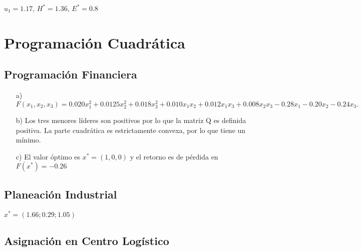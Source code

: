 \documentclass[12pt]{article}
\begin{document}
$u_1 = 1.17$, $H^{*} = 1.36$, $E^{*} = 0.8$

\section*{Programación Cuadrática}

\subsection{Programación Financiera}

\begin{itemize}
    \item [a)]  $F(x_1,x_2,x_3)= 0.020x_1^2+0.0125x_2^2+0.018x_3^2 +0.010x_1x_2+0.012x_1x_3+0.008x_2x_3 -0.28x_1-0.20x_2-0.24x_3.$ 
    \item[b)] Los tres menores líderes son positivos por lo que la matriz Q es definida positiva. La parte cuadrática es estrictamente convexa, por lo que tiene un mínimo. 
    \item[c)] El valor óptimo es $x^{*} = (1,0,0)$ y el retorno es de pérdida en $F(x^{*}) = -0.26$
\end{itemize}

\subsection{Planeación Industrial}

$x^{*} = (1.66;0.29;1.05)$

\subsection{Asignación en Centro Logístico}
\end{document}
